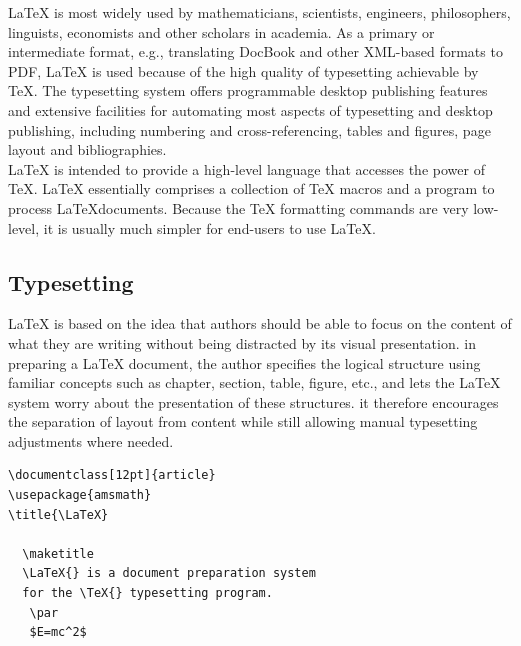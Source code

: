 \noindent\LaTeX{} is most widely used by mathematicians, scientists, 
engineers, philosophers, linguists, economists and other scholars in 
academia. As a primary or intermediate format, e.g., translating DocBook 
and other XML-based formats to PDF, \LaTeX{} is used because of the 
high quality of typesetting achievable by \TeX. The typesetting system 
offers programmable desktop publishing features and extensive facilities 
for automating most aspects of typesetting and desktop publishing, 
including numbering and cross-referencing, tables and figures, 
page layout and bibliographies.\\

\noindent\LaTeX{} is intended to provide a high-level language that
accesses the power of \TeX. \LaTeX{} essentially comprises a
collection of \TeX{} macros and a program to process \LaTeX documents. 
Because the \TeX{} formatting commands are very low-level, it is usually 
much simpler for end-users to use \LaTeX{}.


\subsection{Typesetting}
\LaTeX{} is based on the idea that authors should be able to focus on 
the content of what they are writing without being distracted by its 
visual presentation. in preparing a \LaTeX{} document, the author 
specifies the logical structure using familiar concepts such as 
chapter, section, table, figure, etc., and lets the \LaTeX{} system 
worry about the presentation of these structures. it therefore 
encourages the separation of layout from content while still allowing 
manual typesetting adjustments where needed. 

\begin{verbatim}
\documentclass[12pt]{article}
\usepackage{amsmath}
\title{\LaTeX}

  \maketitle 
  \LaTeX{} is a document preparation system 
  for the \TeX{} typesetting program.
   \par 
   $E=mc^2$

\end{verbatim}

